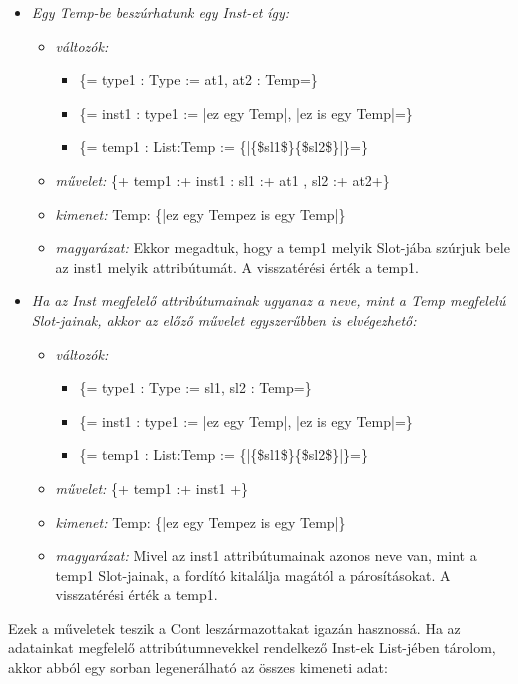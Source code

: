 {\begin{itemize}
\item \emph{ Egy Temp-be beszúrhatunk egy Inst-et így:}
\begin{itemize}
\item \emph{változók:}
\begin{itemize}
\item \{= type1 : Type  := at1, at2 : Temp=\}
\item \{= inst1 : type1  := {|ez egy Temp|}, {|ez is egy Temp|}=\}
\item \{= temp1 : List:Temp  := \{|\{\$sl1\$\}\{\$sl2\$\}|\}=\}
\end{itemize}
\item \emph{művelet:}
\{+ temp1 :+ inst1 : sl1 :+ at1 , sl2 :+ at2+\}
\item \emph{kimenet:}
Temp: \{|ez egy Tempez is egy Temp|\}
\item \emph{magyarázat:}
Ekkor megadtuk, hogy a temp1 melyik Slot-jába szúrjuk bele az inst1 melyik attribútumát.
A visszatérési érték a temp1.
\end{itemize}

\item \emph{Ha az Inst megfelelő attribútumainak ugyanaz a neve, mint a Temp megfelelú Slot-jainak, akkor az előző művelet egyszerűbben is elvégezhető:}
\begin{itemize}
\item \emph{változók:}
\begin{itemize}
\item \{= type1 : Type  := sl1, sl2 : Temp=\}
\item \{= inst1 : type1  := {|ez egy Temp|}, {|ez is egy Temp|}=\}
\item \{= temp1 : List:Temp  := \{|\{\$sl1\$\}\{\$sl2\$\}|\}=\}
\end{itemize}
\item \emph{művelet:}
\{+ temp1 :+ inst1 +\}
\item \emph{kimenet:}
Temp: \{|ez egy Tempez is egy Temp|\}
\item \emph{magyarázat:}
Mivel az inst1 attribútumainak azonos neve van, mint a temp1 Slot-jainak, a fordító kitalálja magától a párosításokat.
A visszatérési érték a temp1.
\end{itemize}

\end{itemize}
 
Ezek a műveletek teszik a Cont leszármazottakat igazán hasznossá.
Ha az adatainkat megfelelő attribútumnevekkel rendelkező Inst-ek List-jében tárolom,
akkor abból egy sorban legenerálható az összes kimeneti adat:

}
